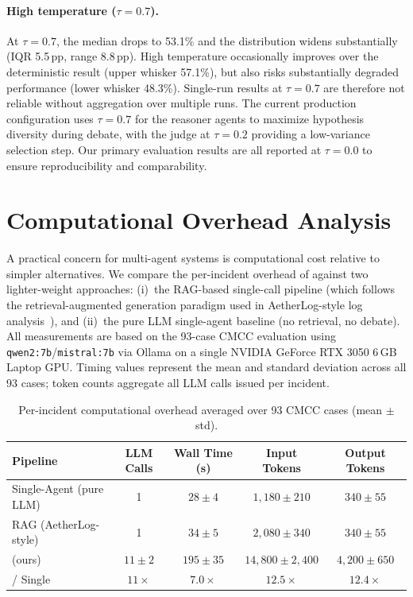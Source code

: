 \paragraph{High temperature ($\tau{=}0.7$).}
At $\tau{=}0.7$, the median drops to 53.1\% and the distribution widens substantially (IQR
5.5\,pp, range 8.8\,pp). High temperature occasionally improves over the deterministic result
(upper whisker 57.1\%), but also risks substantially degraded performance (lower whisker
48.3\%). Single-run results at $\tau{=}0.7$ are therefore not reliable without aggregation
over multiple runs. The current production configuration uses $\tau{=}0.7$ for the reasoner
agents to maximize hypothesis diversity during debate, with the judge at $\tau{=}0.2$
providing a low-variance selection step. Our primary evaluation results are all reported at
$\tau{=}0.0$ to ensure reproducibility and comparability.

\section{Computational Overhead Analysis}
\label{sec:overhead}

A practical concern for multi-agent systems is computational cost relative to simpler
alternatives. We compare the per-incident overhead of \systemname{} against two lighter-weight
approaches: (i)~the RAG-based single-call pipeline (which follows the retrieval-augmented
generation paradigm used in AetherLog-style log
analysis~\cite{lewis2021retrievalaugmentedgenerationknowledgeintensivenlp}), and (ii)~the pure
LLM single-agent baseline (no retrieval, no debate). All measurements are based on the 93-case
CMCC evaluation using \texttt{qwen2:7b}/\texttt{mistral:7b} via Ollama on a single NVIDIA
GeForce RTX 3050 6\,GB Laptop GPU. Timing values represent the mean and standard deviation across all 93 cases; token counts
aggregate all LLM calls issued per incident.

\begin{table}[H]
\centering
\caption{Per-incident computational overhead averaged over 93 CMCC cases (mean $\pm$ std).}
\label{tab:overhead}
\begin{tabular}{lcccc}
\toprule
\textbf{Pipeline} & \textbf{LLM Calls} & \textbf{Wall Time (s)} & \textbf{Input Tokens} & \textbf{Output Tokens} \\
\midrule
Single-Agent (pure LLM) & 1          & $28 \pm 4$   & $1{,}180 \pm 210$        & $340 \pm 55$        \\
RAG (AetherLog-style)   & 1          & $34 \pm 5$   & $2{,}080 \pm 340$        & $340 \pm 55$        \\
\systemname{} (ours)    & $11 \pm 2$ & $195 \pm 35$ & $14{,}800 \pm 2{,}400$   & $4{,}200 \pm 650$   \\
\midrule
\systemname{} / Single  & $11\times$ & $7.0\times$  & $12.5\times$             & $12.4\times$        \\
\bottomrule
\end{tabular}
\end{table}


